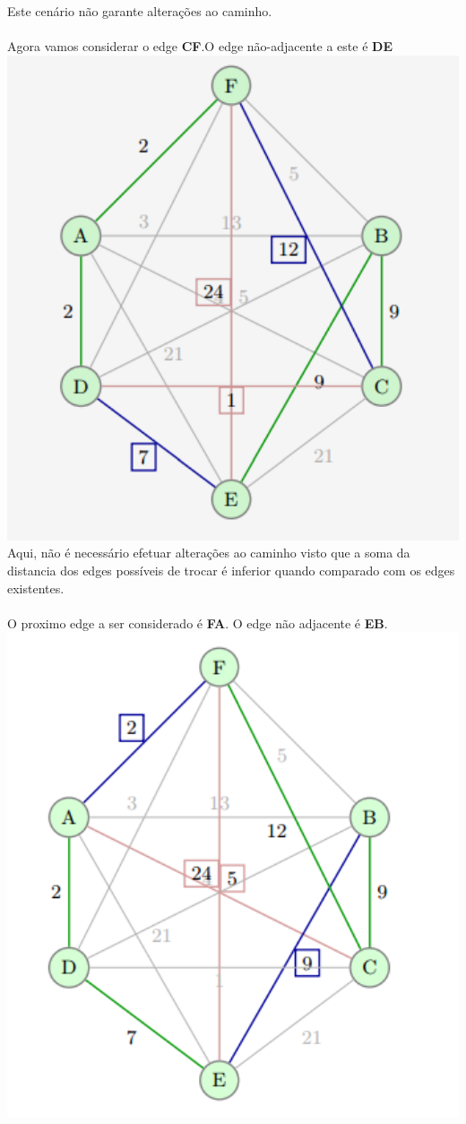 \documentclass[12pt,a4paper,portrait]{article}
\begin{document}
			Este cenário não garante alterações ao caminho.\\\\
			\newpage
			Agora vamos considerar o edge \textbf{CF}.O edge não-adjacente a este é \textbf{DE}\\
			\includegraphics[width=1.0\textwidth]{imagens/7}
			Aqui, não é necessário efetuar alterações ao caminho visto que a soma da distancia dos edges possíveis de trocar é inferior quando comparado com os edges existentes.\\\\
			\newpage
			O proximo edge a ser considerado é  \textbf{FA}. O edge não adjacente é \textbf{EB}.\\
			\includegraphics[width=1.0\textwidth]{imagens/8}
\end{document}
